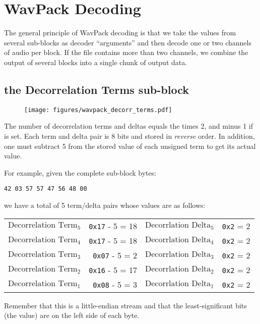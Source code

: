 \clearpage

\section{WavPack Decoding}
The general principle of WavPack decoding is that we take the
values from several sub-blocks as decoder ``arguments''
and then decode one or two channels of audio per block.
If the file contains more than two channels, we combine the output
of several blocks into a single chunk of output data.

\subsection{the Decorrelation Terms sub-block}
\label{wavpack_decorr_terms}
\begin{figure}[h]
\texttt{[image: figures/wavpack\_decorr\_terms.pdf]}
\end{figure}
\par
\noindent
The number of decorrelation terms and deltas
equals the  times 2, and minus 1 if
 is set.
Each term and delta pair is 8 bits and stored in \textit{reverse} order.
In addition, one must subtract 5 from the stored value of each
unsigned term to get its actual value.

For example, given the complete sub-block bytes:
\begin{Verbatim}[frame=single]
42 03 57 57 47 56 48 00
\end{Verbatim}
we have a total of 5 term/delta pairs whose values are as follows:
\begin{table}[h]
\begin{tabular}{r r | r r}
$\text{Decorrelation Term}_5$ & \texttt{0x17} - 5 = 18 & $\text{Decorrlation Delta}_5$ & \texttt{0x2} = 2 \\
$\text{Decorrelation Term}_4$ & \texttt{0x17} - 5 = 18 & $\text{Decorrlation Delta}_4$ & \texttt{0x2} = 2 \\
$\text{Decorrelation Term}_3$ & \texttt{0x07} - 5 = 2 & $\text{Decorrlation Delta}_3$ & \texttt{0x2} = 2 \\
$\text{Decorrelation Term}_2$ & \texttt{0x16} - 5 = 17 & $\text{Decorrlation Delta}_2$ & \texttt{0x2} = 2 \\
$\text{Decorrelation Term}_1$ & \texttt{0x08} - 5 = 3 & $\text{Decorrlation Delta}_1$ & \texttt{0x2} = 2 \\
\end{tabular}
\end{table}
\par
\noindent
Remember that this is a little-endian stream and that the least-significant
bits (the  value) are on the left side of each byte.

